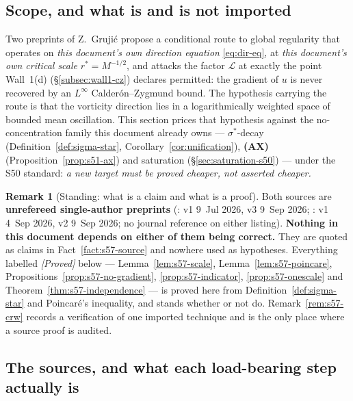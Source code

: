 \documentclass[11pt]{article}
\theoremstyle{definition}
\newtheorem{remark}[theorem]{Remark}
\theoremstyle{remark}
\begin{document}
\subsection{Scope, and what is and is not imported}
\label{subsec:s57-scope}

Two preprints of Z.~Gruji\'c \cite{Grujic2026Log,Grujic2026Decay} propose a
conditional route to global regularity that operates on \emph{this document's
own direction equation} \eqref{eq:dir-eq}, at \emph{this document's own
critical scale} $r^*=M^{-1/2}$, and attacks the factor $\mathcal{L}$ at
exactly the point Wall~1(d) (\S\ref{subsec:wall1-cz}) declares permitted: the
gradient of $u$ is never recovered by an $L^\infty$ Calder\'on--Zygmund bound.
The hypothesis carrying the route is that the vorticity direction lies in a
logarithmically weighted space of bounded mean oscillation. This section
prices that hypothesis against the no-concentration family this document
already owns --- $\sigma^*$-decay
(Definition~\ref{def:sigma-star}, Corollary~\ref{cor:unification}),
\textbf{(AX)} (Proposition~\ref{prop:s51-ax}) and saturation
(\S\ref{sec:saturation-s50}) --- under the S50 standard: \emph{a new target
must be proved cheaper, not asserted cheaper.}

\begin{remark}[Standing: what is a claim and what is a proof]
  \label{rem:s57-standing}
  Both sources are \textbf{unrefereed single-author preprints}
  (\cite{Grujic2026Log}: v1 9~Jul 2026, v3 9~Sep 2026;
  \cite{Grujic2026Decay}: v1 4~Sep 2026, v2 9~Sep 2026; no journal
  reference on either listing). \textbf{Nothing in this document depends on
  either of them being correct.} They are quoted as claims in
  Fact~\ref{fact:s57-source} and nowhere used as hypotheses. Everything
  labelled \emph{[Proved]} below --- Lemma~\ref{lem:s57-scale},
  Lemma~\ref{lem:s57-poincare}, Propositions~\ref{prop:s57-no-gradient},
  \ref{prop:s57-indicator}, \ref{prop:s57-onescale} and
  Theorem~\ref{thm:s57-independence} --- is proved here from
  Definition~\ref{def:sigma-star} and Poincar\'e's inequality, and stands
  whether or not \cite{Grujic2026Log,Grujic2026Decay} do.
  Remark~\ref{rem:s57-crw} records a verification of one imported technique
  and is the only place where a source proof is audited.
\end{remark}

\subsection{The sources, and what each load-bearing step actually is}
\label{subsec:s57-sources}
\end{document}
